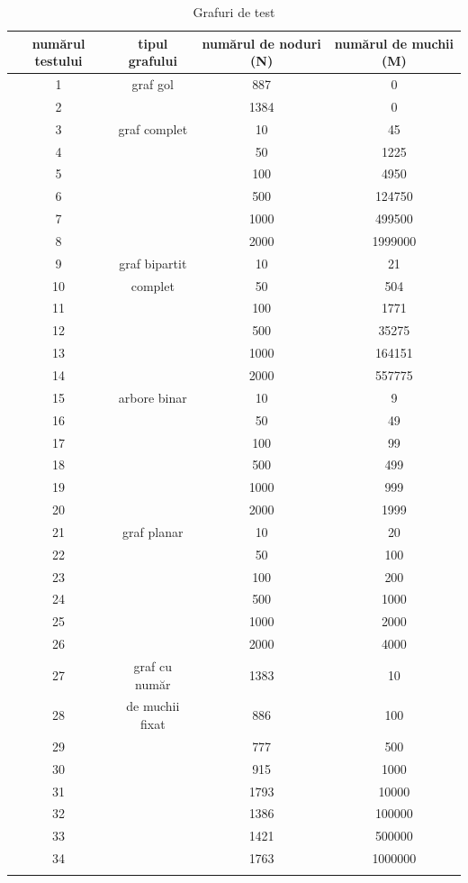 \documentclass[runningheads]{llncs}
\begin{document}
\begin{longtable}{@{}|c|c|c|c|@{}}
    \hline\hline
    numărul testului & tipul grafului  & numărul de noduri (N)  & numărul de muchii (M) \\
    \hline
    1 & graf gol  & 887  & 0 \\
    2 &  & 1384 & 0 \\ \hline
    3 & graf complet & 10 & 45 \\
    4 &  & 50 & 1225 \\
    5 &  & 100 & 4950 \\
    6 &  & 500 & 124750 \\
    7 &  & 1000 & 499500 \\
    8 &  & 2000 & 1999000 \\ \hline
    9 & graf bipartit & 10 & 21 \\
    10 & complet & 50 & 504 \\
    11 &  & 100 & 1771 \\
    12 &  & 500 & 35275 \\
    13 &  & 1000 & 164151 \\
    14 &  & 2000 & 557775 \\ \hline
    15 & arbore binar & 10 & 9 \\
    16 &  & 50 & 49 \\
    17 &  & 100 & 99 \\
    18 &  & 500 & 499 \\
    19 &  & 1000 & 999 \\
    20 &  & 2000 & 1999 \\ \hline
    21 & graf planar & 10 & 20 \\
    22 &  & 50 & 100 \\
    23 &  & 100 & 200 \\
    24 &  & 500 & 1000 \\
    25 &  & 1000 & 2000\\
    26 &  & 2000 & 4000 \\ \hline
    27 & graf cu număr & 1383 & 10 \\
    28 & de muchii fixat & 886 & 100 \\
    29 &  & 777 & 500 \\
    30 &  & 915 & 1000 \\
    31 &  & 1793 & 10000 \\
    32 &  & 1386 & 100000 \\
    33 &  & 1421 & 500000 \\
    34 &  & 1763 & 1000000 \\
    \hline
    \caption{Grafuri de test}
    \label{tab1}
    \end{longtable}
\end{document}
